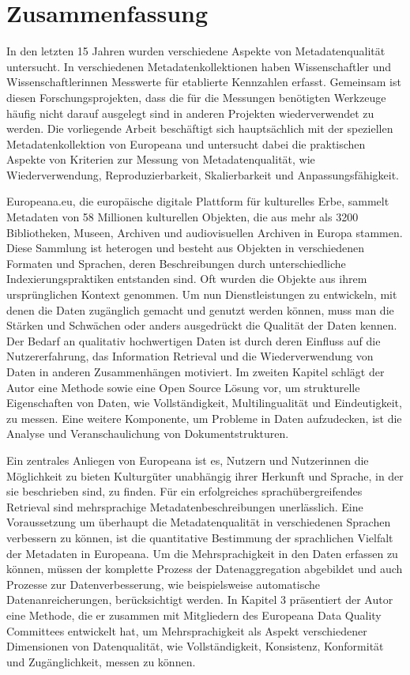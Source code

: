 \chapter*{Zusammenfassung}


In den letzten 15 Jahren wurden verschiedene Aspekte von Metadatenqualität untersucht. In verschiedenen Metadatenkollektionen haben Wissenschaftler und Wissenschaftlerinnen Messwerte für etablierte Kennzahlen erfasst. Gemeinsam ist diesen Forschungsprojekten, dass die für die Messungen benötigten Werkzeuge häufig nicht darauf ausgelegt sind in anderen Projekten wiederverwendet zu werden. Die vorliegende Arbeit beschäftigt sich hauptsächlich mit der speziellen Metadatenkollektion von Europeana und untersucht dabei die praktischen Aspekte von Kriterien zur Messung von Metadatenqualität, wie Wiederverwendung, Reproduzierbarkeit, Skalierbarkeit und Anpassungsfähigkeit.

Europeana.eu, die europäische digitale Plattform für kulturelles Erbe, sammelt Metadaten von 58 Millionen kulturellen Objekten, die aus mehr als 3200 Bibliotheken, Museen, Archiven und audiovisuellen Archiven in Europa stammen. Diese Sammlung ist heterogen und besteht aus Objekten in verschiedenen Formaten und Sprachen, deren Beschreibungen durch unterschiedliche Indexierungspraktiken entstanden sind. Oft wurden die Objekte aus ihrem ursprünglichen Kontext genommen. Um nun Dienstleistungen zu entwickeln, mit denen die Daten zugänglich gemacht und genutzt werden können, muss man die Stärken und Schwächen oder anders ausgedrückt die Qualität der Daten kennen. Der Bedarf an qualitativ hochwertigen Daten ist durch deren Einfluss auf die Nutzererfahrung, das Information Retrieval und die Wiederverwendung von Daten in anderen Zusammenhängen motiviert. Im zweiten Kapitel schlägt der Autor eine Methode sowie eine Open Source Lösung vor, um strukturelle Eigenschaften von Daten, wie Vollständigkeit, Multilingualität und Eindeutigkeit, zu messen. Eine weitere Komponente, um Probleme in Daten aufzudecken, ist die Analyse und Veranschaulichung von Dokumentstrukturen.

Ein zentrales Anliegen von Europeana ist es, Nutzern und Nutzerinnen die Möglichkeit zu bieten Kulturgüter unabhängig ihrer Herkunft und Sprache, in der sie beschrieben sind, zu finden. Für ein erfolgreiches sprachübergreifendes Retrieval sind mehrsprachige Metadatenbeschreibungen unerlässlich. Eine Voraussetzung um überhaupt die Metadatenqualität in verschiedenen Sprachen verbessern zu können, ist die quantitative Bestimmung der sprachlichen Vielfalt der Metadaten in Europeana. Um die Mehrsprachigkeit in den Daten erfassen zu können, müssen der komplette Prozess der Datenaggregation abgebildet und auch Prozesse zur Datenverbesserung, wie beispielsweise automatische Datenanreicherungen, berücksichtigt werden. In Kapitel 3 präsentiert der Autor eine Methode, die er zusammen mit Mitgliedern des Europeana Data Quality Committees entwickelt hat, um Mehrsprachigkeit als Aspekt verschiedener Dimensionen von Datenqualität, wie Vollständigkeit, Konsistenz, Konformität und Zugänglichkeit, messen zu können.

